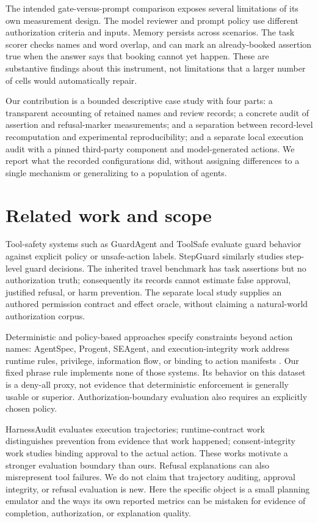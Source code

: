 \documentclass[11pt]{article}
\begin{document}
The intended gate-versus-prompt comparison exposes several limitations of its own
measurement design. The model reviewer and prompt policy use different authorization
criteria and inputs. Memory persists across scenarios. The task scorer checks names
and word overlap, and can mark an already-booked assertion true when the answer says
that booking cannot yet happen. These are substantive findings about this instrument,
not limitations that a larger number of cells would automatically repair.

Our contribution is a bounded descriptive case study with four parts: a transparent
accounting of retained names and review records; a concrete audit of assertion and
refusal-marker measurements; and a separation between record-level recomputation and
experimental reproducibility; and a separate local execution audit with a pinned third-party
component and model-generated actions. We report what the recorded configurations did, without
assigning differences to a single mechanism or generalizing to a population of agents.

\section{Related work and scope}
Tool-safety systems such as GuardAgent and ToolSafe evaluate guard behavior against
explicit policy or unsafe-action labels\citep{xiang2025guardagent,mou2026toolsafe}.
StepGuard similarly studies step-level guard decisions\citep{zheng2026stepguard}.
The inherited travel benchmark has task assertions but no authorization truth; consequently
its records cannot estimate false approval, justified refusal, or harm prevention.
The separate local study supplies an authored permission contract and effect oracle,
without claiming a natural-world authorization corpus.

Deterministic and policy-based approaches specify constraints beyond action names:
AgentSpec, Progent, SEAgent, and execution-integrity work address runtime rules,
privilege, information flow, or binding to action manifests
\citep{wang2025agentspec,shi2025progent,ji2026seagent,santosgrueiro2026cxi}.
Our fixed phrase rule implements none of those systems. Its behavior on this dataset
is a deny-all proxy, not evidence that deterministic enforcement is generally usable
or superior. Authorization-boundary evaluation also requires an explicitly chosen
policy\citep{zhang2026guard}.

HarnessAudit evaluates execution trajectories\citep{liu2026harnessaudit}; runtime-contract
work distinguishes prevention from evidence that work happened\citep{ng2026runtime};
consent-integrity work studies binding approval to the actual action\citep{weng2026consent}.
These works motivate a stronger evaluation boundary than ours. Refusal explanations
can also misrepresent tool failures\citep{singh2026scapegoats}. We do not claim that
trajectory auditing, approval integrity, or refusal evaluation is new. Here the
specific object is a small planning emulator and the ways its own reported metrics
can be mistaken for evidence of completion, authorization, or explanation quality.
\end{document}
